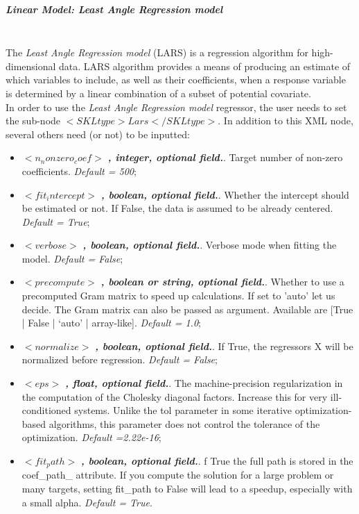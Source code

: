 \subparagraph{Linear Model: Least Angle Regression model}
\mbox{}
\\The \textit{Least Angle Regression model} (LARS)  is a regression algorithm for high-dimensional data. LARS algorithm provides a means of producing an estimate of which variables to include, as well as their coefficients, when a  response variable is determined by a linear combination of a subset of potential covariate.
\\In order to use the  \textit{Least Angle Regression model} regressor, the user needs to set the sub-node $<SKLtype>Lars</SKLtype>$. In addition to this XML node, several others need (or not) to be inputted:
\begin{itemize}
\item $<n_nonzero_coef>$ \textbf{\textit{, integer, optional field.}}. Target number of non-zero coefficients. \textit{Default = 500};
\item $<fit_intercept>$ \textbf{\textit{, boolean, optional field.}}.  Whether the intercept should be estimated or not. If False, the data is assumed to be already centered. \textit{Default =  True};
\item $<verbose>$ \textbf{\textit{, boolean, optional field.}}.  Verbose mode when fitting the model. \textit{Default =  False};
\item $<precompute>$ \textbf{\textit{, boolean or string, optional field.}}.  Whether to use a precomputed Gram matrix to speed up calculations. If set to 'auto' let us decide. The Gram matrix can also be passed as argument. Available are [True | False | ‘auto’ | array-like]. \textit{Default = 1.0};
\item $<normalize>$ \textbf{\textit{, boolean, optional field.}}.  If True, the regressors X will be normalized before regression. \textit{Default =  False};
\item $<eps>$ \textbf{\textit{, float, optional field.}}.  The machine-precision regularization in the computation of the Cholesky diagonal factors. Increase this for very ill-conditioned systems. Unlike the tol parameter in some iterative optimization-based algorithms, this parameter does not control the tolerance of the optimization. \textit{Default =2.22e-16};
\item $<fit_path>$ \textbf{\textit{, boolean, optional field.}}.  f True the full path is stored in the coef\_path\_ attribute. If you compute the solution for a large problem or many targets, setting fit\_path to False will lead to a speedup, especially with a small alpha. \textit{Default =  True}.
\end{itemize}
